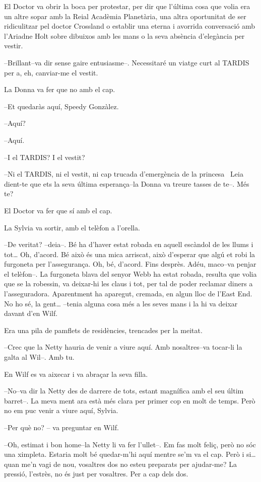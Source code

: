 El Doctor va obrir la boca per protestar, per dir que l'última cosa que
volia era un altre sopar amb la Reial Acadèmia Planetària, una altra
oportunitat de ser ridiculitzar pel doctor Crossland o establir una
eterna i avorrida conversació amb l'Ariadne Holt sobre dibuixos amb les
mans o la seva absència d'elegància per vestir.

--Brillant--va dir sense gaire entusiasme--. Necessitaré un viatge curt
al TARDIS per a, eh, canviar-me el vestit.

La Donna va fer que no amb el cap.

--Et quedaràs aquí, Speedy Gonzàlez.

--Aquí?

--Aquí.

--I el TARDIS? I el vestit?

--Ni el TARDIS, ni el vestit, ni cap trucada d'emergència de la princesa
~Leia dient-te que ets la seva última esperança--la Donna va treure
tasses de te--. Més te?

El Doctor va fer que sí amb el cap.

La Sylvia va sortir, amb el telèfon a l'orella.

--De veritat? --deia--. Bé ha d'haver estat robada en aquell escàndol de
les llums i tot\ldots{} Oh, d'acord. Bé això és una mica arriscat, això
d'esperar que algú et robi la furgoneta per l'assegurança. Oh, bé,
d'acord. Fins desprès. Adéu, maco--va penjar el telèfon--. La furgoneta
blava del senyor Webb ha estat robada, resulta que volia que se la
robessin, va deixar-hi les claus i tot, per tal de poder reclamar diners
a l'asseguradora. Aparentment ha aparegut, cremada, en algun lloc de
l'East End. No ho sé, la gent\ldots{} --tenia alguna cosa més a les
seves mans i la hi va deixar davant d'en Wilf.

Era una pila de pamflets de residències, trencades per la meitat.

--Crec que la Netty hauria de venir a viure aquí. Amb nosaltres--va
tocar-li la galta al Wil--. Amb tu.

En Wilf es va aixecar i va abraçar la seva filla.

--No--va dir la Netty des de darrere de tots, estant magnífica amb el
seu últim barret--. La meva ment ara està més clara per primer cop en
molt de temps. Però no em puc venir a viure aquí, Sylvia.

--Per què no? -- va preguntar en Wilf.

--Oh, estimat i bon home--la Netty li va fer l'ullet--. Em fas molt
feliç, però no sóc una ximpleta. Estaria molt bé quedar-m'hi aquí mentre
se'm va el cap. Però i si\ldots{} quan me'n vagi de nou, vosaltres dos
no esteu preparats per ajudar-me? La pressió, l'estrès, no és just per
vosaltres. Per a cap dels dos.

